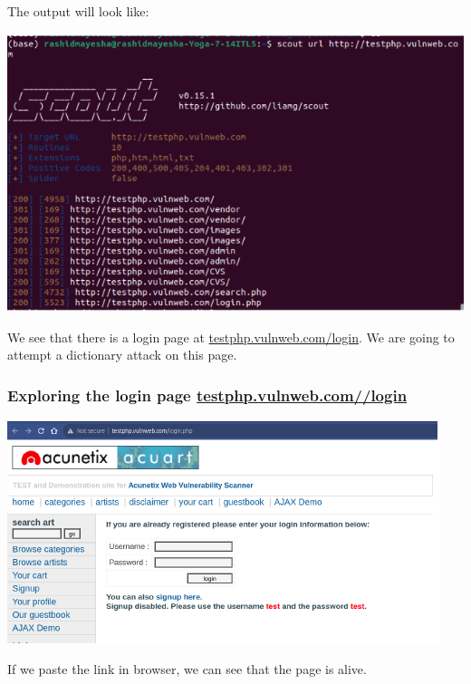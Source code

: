 \documentclass[12pt]{article}
\begin{document}
The output will look like:

\begin{center}
    \includegraphics[max width=\textwidth]{Image9.png}
\end{center}

We see that there is a login page at \href{http://testphp.vulnweb.com/login}{testphp.vulnweb.com/login}. We are going to attempt a dictionary attack on this page.

\subsubsection{Exploring the login page \href{http://testphp.vulnweb.com/login}{testphp.vulnweb.com//login}}\label{subsubsec:exploring-the-login-page-testphp.vulnweb.com-login}

\begin{center}
    \includegraphics[max width=\textwidth]{Image10.png}
\end{center}

If we paste the link in browser, we can see that the page is alive.
\end{document}
